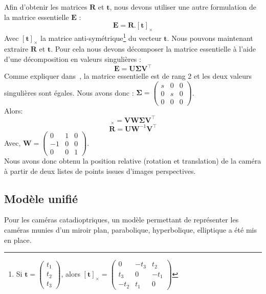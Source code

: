 Afin d'obtenir les matrices $\mathbf{R}$ et $\mathbf{t}$, nous devons utiliser une autre formulation de la matrice essentielle $\mathbf{E}$ :
\begin{equation}
\mathbf{E} = \mathbf{R} . [\mathbf{t}]_\times
\end{equation}
Avec $[\mathbf{t}]_\times$ la matrice anti-symétrique\footnote{Si $\mathbf{t}=\begin{pmatrix}t_1\\t_2\\t_3\end{pmatrix}$, alors $[\mathbf{t}]_\times=\begin{pmatrix}0&-t_3&t_2\\t_3&0&-t_1\\-t_2&t_1&0\end{pmatrix}$} du vecteur $\mathbf{t}$.
Nous pouvons maintenant extraire $\mathbf{R}$ et $\mathbf{t}$. Pour cela nous devons décomposer la matrice essentielle  à l'aide d'une décomposition en valeurs singulières :
$$\mathbf{E}=\mathbf{U} \mathbf{\Sigma} \mathbf{V}^{\top}$$
Comme expliquer dans~\cite{Hartley03Book}, la matrice essentielle est de rang 2 et les deux valeurs singulières sont égales.
Nous avons donc : $\mathbf{\Sigma} = \begin{pmatrix}s&0&0\\0&s&0\\0&0&0\end{pmatrix}$.\\
Alors:
\begin{equation}
[\mathbf{t}]_\times = \mathbf{V} \mathbf{W} \mathbf{\Sigma} \mathbf{V}^{\top}
\end{equation}
\begin{equation}
\mathbf{R} = \mathbf{U} \mathbf{W}^{-1} \mathbf{V}^{\top}
\end{equation}
Avec, $\mathbf{W}=\begin{pmatrix}0&1&0\\-1&0&0\\0&0&1\end{pmatrix}$.\\
Nous avons donc obtenu la position relative (rotation et translation) de la caméra à partir de deux listes de points issues d'images perspectives.


\subsection{Modèle unifié}

Pour les caméras catadioptriques, un modèle permettant de représenter les caméras munies d'un miroir plan, parabolique, hyperbolique, elliptique a été mis en place.

